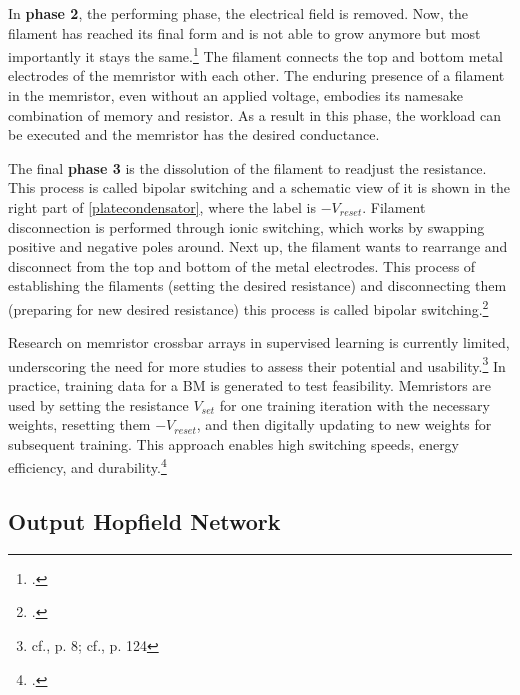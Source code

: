 In \textbf{phase 2}, the performing phase, the electrical field is removed.
Now, the filament has reached its final form and is not able to grow anymore but most importantly it stays the same.\footcite[cf.][1-2]{sungPerspectiveReviewMemristive2018}
The filament connects the top and bottom metal electrodes of the memristor with each other.
The enduring presence of a filament in the memristor, even without an applied voltage, embodies its namesake combination of memory and resistor.
As a result in this phase, the workload can be executed and the memristor has the desired conductance.

The final \textbf{phase 3} is the dissolution of the filament to readjust the resistance.
This process is called bipolar switching and a schematic view of it is shown in the right part of \ref{platecondensator}, where the label is \(-V_{reset}\).
Filament disconnection is performed through ionic switching, which works by swapping positive and negative poles around.
Next up, the filament wants to rearrange and disconnect from the top and bottom of the metal electrodes. 
This process of establishing the filaments (setting the desired resistance) and disconnecting them (preparing for new desired resistance) this process is called bipolar switching.\footcite[cf.][7]{sungPerspectiveReviewMemristive2018}

Research on memristor crossbar arrays in supervised learning is currently limited, underscoring the need for more studies to assess their potential and usability.\footnote{cf.\cite{amirsoleimaniInMemoryVectorMatrixMultiplication2020}, p. 8; cf.\cite{sungPerspectiveReviewMemristive2018}, p. 124}
In practice, training data for a \ac{BM} is generated to test feasibility.
Memristors are used by setting the resistance \(V_{set}\) for one training iteration with the necessary weights, resetting them \(-V_{reset}\), and then digitally updating to new weights for subsequent training.
This approach enables high switching speeds, energy efficiency, and durability.\footcite[cf.][3]{amirsoleimaniInMemoryVectorMatrixMultiplication2020}

\subsection{Output Hopfield Network}

